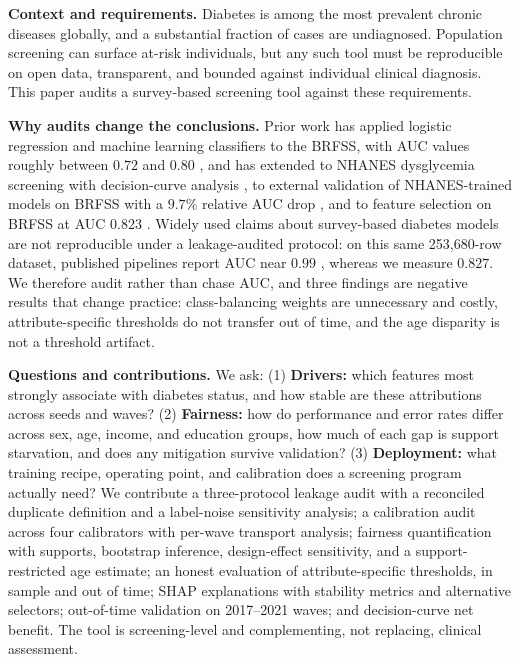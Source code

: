 \documentclass[conference]{IEEEtran}
\begin{document}
\textbf{Context and requirements.} Diabetes is among the most prevalent chronic diseases globally, and a substantial fraction of cases are undiagnosed. Population screening can surface at-risk individuals, but any such tool must be reproducible on open data, transparent, and bounded against individual clinical diagnosis. This paper audits a survey-based screening tool against these requirements.

\textbf{Why audits change the conclusions.} Prior work has applied logistic regression and machine learning classifiers to the BRFSS, with AUC values roughly between $0.72$ and $0.80$ \cite{xie2019}, and has extended to NHANES dysglycemia screening with decision-curve analysis \cite{sun2026beyond}, to external validation of NHANES-trained models on BRFSS with a $9.7\%$ relative AUC drop \cite{pall2026comprehensive}, and to feature selection on BRFSS at AUC $0.823$ \cite{aich2026copula}. Widely used claims about survey-based diabetes models are not reproducible under a leakage-audited protocol: on this same 253{,}680-row dataset, published pipelines report AUC near $0.99$ \cite{pall2026comprehensive}, whereas we measure $0.827$. We therefore audit rather than chase AUC, and three findings are negative results that change practice: class-balancing weights are unnecessary and costly, attribute-specific thresholds do not transfer out of time, and the age disparity is not a threshold artifact.

\textbf{Questions and contributions.} We ask: (1) \textbf{Drivers:} which features most strongly associate with diabetes status, and how stable are these attributions across seeds and waves? (2) \textbf{Fairness:} how do performance and error rates differ across sex, age, income, and education groups, how much of each gap is support starvation, and does any mitigation survive validation? (3) \textbf{Deployment:} what training recipe, operating point, and calibration does a screening program actually need? We contribute a three-protocol leakage audit with a reconciled duplicate definition and a label-noise sensitivity analysis; a calibration audit across four calibrators with per-wave transport analysis; fairness quantification with supports, bootstrap inference, design-effect sensitivity, and a support-restricted age estimate; an honest evaluation of attribute-specific thresholds, in sample and out of time; SHAP explanations with stability metrics and alternative selectors; out-of-time validation on 2017--2021 waves; and decision-curve net benefit. The tool is screening-level and complementing, not replacing, clinical assessment.
\end{document}
